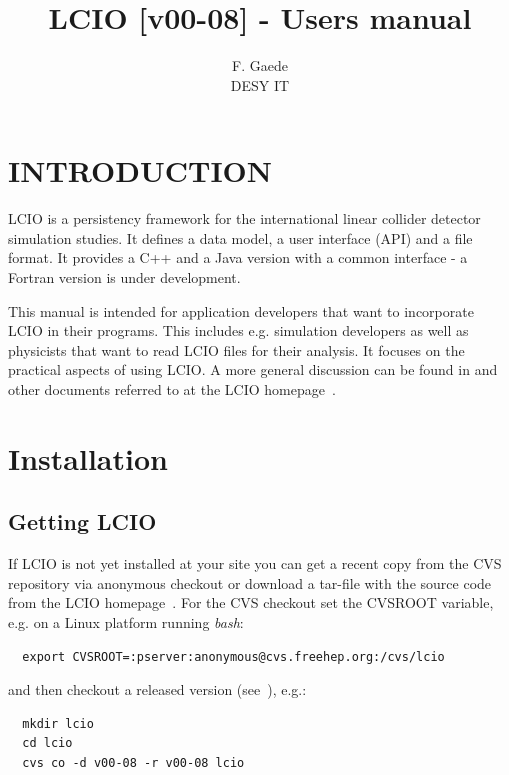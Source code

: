 \documentclass[twoside]{article}
\begin{document}
\title{LCIO [v00-08] -  Users manual}


\author{F. Gaede \\  DESY IT} 

\maketitle
\tableofcontents

\thispagestyle{fancy}
\section{INTRODUCTION \label{intro}}

LCIO is a persistency framework for the international linear collider detector 
simulation studies. It defines a data model, a user interface (API) and a file format.
It provides a C++ and a Java version with a common interface - a Fortran version is under 
development.

This manual is intended for application developers that want to incorporate LCIO in their 
programs. This includes e.g. simulation developers as well as  physicists that want to 
read LCIO files for their analysis. It focuses on the practical aspects of using LCIO. A more 
general discussion can be found in \cite{lcio_chep} and other documents referred to at the 
LCIO homepage~\cite{lcio_home}.

\section{Installation}
\subsection{Getting LCIO}
If LCIO is not yet installed at your site you can get a recent copy from the CVS repository 
via anonymous checkout or download a tar-file with the source code from the LCIO 
homepage~\cite{lcio_home}. For the CVS checkout set the CVSROOT variable, e.g. on a Linux platform 
running {\it bash}:

\begin{verbatim}
  export CVSROOT=:pserver:anonymous@cvs.freehep.org:/cvs/lcio
\end{verbatim}

and then checkout a released version (see~\cite{lcio_home}), e.g.:
\begin{verbatim}
  mkdir lcio 
  cd lcio
  cvs co -d v00-08 -r v00-08 lcio
\end{verbatim}
\end{document}
